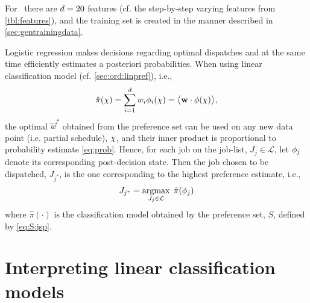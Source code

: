 For \jsp\ there are $d=20$ features (cf. the step-by-step varying features from \cref{tbl:features}), and the training set is created in the manner described in \cref{sec:gentrainingdata}.

Logistic regression makes decisions regarding optimal dispatches and at the same time efficiently estimates a posteriori probabilities. When using linear classification model (cf. \cref{sec:ord:linpref}), i.e., 
\begin{equation}\label{eq:jsp:linweights}
	\hat{\pi}(\vchi)=\sum_{i=1}^d 
	w_i\phi_i(\vchi)=\inner{\vec{w}}{\vphi(\vchi)},
\end{equation}
the optimal $\vec{w}^*$ obtained from the preference set can be used on any new 
data point (i.e. partial schedule), ${\mathbf{\chi}}$, and their inner product is 
proportional to probability estimate \cref{eq:prob}. 
Hence, for each job on the job-list, $J_j\in\mathcal{L}$, let ${\mathbf{\phi}}_j$ denote 
its corresponding  post-decision state. Then the job chosen to be dispatched, 
$J_{j^*}$, is the one corresponding to the highest preference estimate, i.e.,
\begin{equation}\label{eq:lin}
	J_{j^*}=\argmax_{J_j\in \mathcal{L}}\; \hat{\pi}(\vphi_j)
\end{equation}
where $\hat{\pi}(\cdot)$ is the classification model obtained by the preference 
set, $S$, defined by \cref{eq:S:jsp}. 


\section{Interpreting linear classification models}

